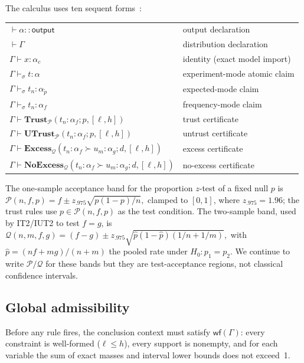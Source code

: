 \documentclass{ceurart}
\newcommand{\Trust}{\textbf{Trust}}
\newcommand{\UTrust}{\textbf{UTrust}}
\newcommand{\Excess}{\textbf{Excess}}
\newcommand{\NoExcess}{\textbf{NoExcess}}
\newcommand{\wf}{\mathsf{wf}}
\newcommand{\CI}{\mathcal{P}}
\newcommand{\CItwo}{\mathcal{Q}}
\begin{document}
The calculus uses ten sequent forms~\cite{dasaro2025tptnd}:
\begin{center}\small
\begin{tabular}{@{}ll@{}}
$\vdash \alpha :: \mathsf{output}$ & output declaration\\
$\vdash \Gamma$ & distribution declaration\\
$\Gamma \vdash x : \alpha_c$ & identity (exact model import)\\
$\Gamma \vdash_\sigma t : \alpha$ & experiment-mode atomic claim\\
$\Gamma \vdash_\sigma t_n : \alpha_{\tilde p}$ & expected-mode claim\\
$\Gamma \vdash_\sigma t_n : \alpha_f$ & frequency-mode claim\\
$\Gamma \vdash \Trust_\CI(t_n:\alpha_f; p,[\ell,h])$
  & trust certificate\\
$\Gamma \vdash \UTrust_\CI(t_n:\alpha_f; p,[\ell,h])$
  & untrust certificate\\
$\Gamma \vdash \Excess_\CItwo(t_n:\alpha_f \succ u_m:\alpha_g; d,[\ell,h])$
  & excess certificate\\
$\Gamma \vdash \NoExcess_\CItwo(t_n:\alpha_f \succ u_m:\alpha_g; d,[\ell,h])$
  & no-excess certificate\\
\end{tabular}
\end{center}

\noindent
The one-sample acceptance band for the proportion $z$-test of a
fixed null $p$ is
\(
  \CI(n,f,p) = f \pm z_{.975}\sqrt{p(1{-}p)/n},
\)
clamped to $[0,1]$, where $z_{.975}=1.96$; the trust rules use
$p\in\CI(n,f,p)$ as the test condition.
The two-sample band, used by \textsc{IT2}/\textsc{IUT2} to test
$f{=}g$, is
\(
  \CItwo(n,m,f,g) = (f{-}g) \pm z_{.975}\sqrt{\hat p(1{-}\hat p)(1/n+1/m)},
\)
with $\hat p = (nf{+}mg)/(n{+}m)$ the pooled rate under
$H_0\!:\!p_1{=}p_2$.  We continue to write $\CI/\CItwo$ for these
bands but they are test-acceptance regions, not classical
confidence intervals.

\subsection{Global admissibility}\label{sec:admiss}

Before any rule fires, the conclusion context must satisfy $\wf(\Gamma)$:
every constraint is well-formed ($\ell\le h$),
every support is nonempty,
and for each variable the sum of exact masses and interval lower bounds
does not exceed~1.
\end{document}
